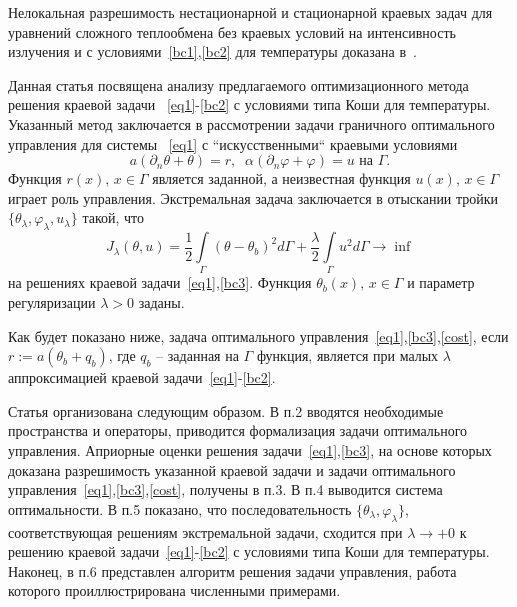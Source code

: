 Нелокальная разрешимость
нестационарной и стационарной краевых задач для уравнений сложного теплообмена
без краевых условий на интенсивность излучения и
с условиями~\eqref{bc1},\eqref{bc2} для температуры доказана в~\cite{CNSNS19,CMMP20}.

Данная статья посвящена анализу предлагаемого оптимизационного метода решения краевой задачи
~\eqref{eq1}-\eqref{bc2} с условиями типа Коши для температуры.
Указанный метод заключается в рассмотрении задачи граничного оптимального управления для
системы ~\eqref{eq1} с ``искусственными`` краевыми условиями
\begin{equation}
    \label{bc3}
    a(\partial_n\theta+\theta) = r,\;\;
    \alpha(\partial_n\varphi+\varphi) = u \text{ на }\Gamma.
\end{equation}
Функция $r(x),\, x\in\Gamma$ является заданной, а неизвестная функция $u(x),\, x\in\Gamma$
играет роль управления.
Экстремальная задача заключается в отыскании тройки $\{\theta_\lambda,\varphi_\lambda,u_\lambda\}$
такой, что
\begin{equation}
    \label{cost}
    J_\lambda(\theta, u) = \frac{1}{2}\int\limits_\Gamma (\theta - \theta_b)^2d\Gamma
    + \frac{\lambda}{2}\int\limits_\Gamma u^2d\Gamma \rightarrow\inf
\end{equation}
на решениях краевой задачи~\eqref{eq1},\eqref{bc3}.
Функция $\theta_b(x),\, x\in\Gamma$  и параметр регуляризации $\lambda>0$ заданы.

Как будет показано ниже, задача оптимального управления~\eqref{eq1},\eqref{bc3},\eqref{cost}, если
$r:=a(\theta_b+q_b)$, где $q_b$ -- заданная на $\Gamma$ функция,
является при малых $\lambda$ аппроксимацией краевой задачи~\eqref{eq1}-\eqref{bc2}.

Статья организована следующим образом.
В п.2 вводятся необходимые пространства и операторы, приводится
формализация задачи оптимального управления.
Априорные оценки решения задачи~\eqref{eq1},\eqref{bc3}, на основе которых
доказана разрешимость указанной краевой задачи и задачи оптимального
управления~\eqref{eq1},\eqref{bc3},\eqref{cost}, получены в п.3.
В п.4 выводится система оптимальности. В п.5 показано, что
последовательность $\{\theta_\lambda,\varphi_\lambda\}$, соответствующая решениям
экстремальной задачи,
сходится при $\lambda\to +0$ к решению краевой задачи~\eqref{eq1}-\eqref{bc2}
с условиями типа Коши для температуры.
Наконец, в п.6 представлен алгоритм решения задачи управления,
работа которого проиллюстрирована численными примерами.

